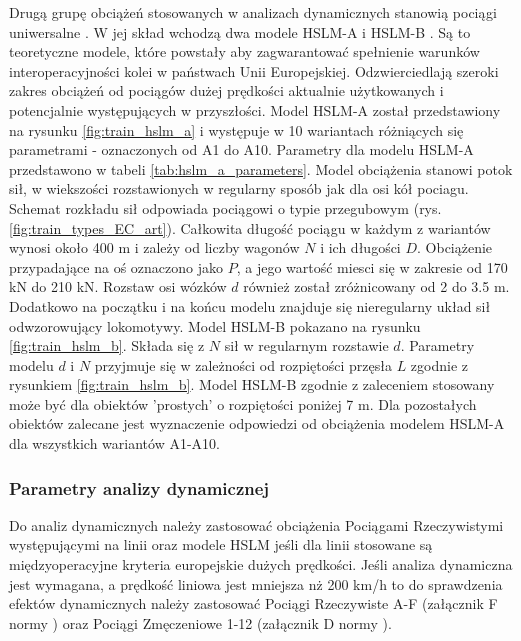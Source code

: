 Drugą grupę obciążeń stosowanych w analizach dynamicznych stanowią pociągi uniwersalne . W jej skład wchodzą dwa modele HSLM-A i HSLM-B . Są to teoretyczne modele, które powstały aby zagwarantować spełnienie warunków interoperacyjności kolei w państwach Unii Europejskiej. Odzwierciedlają szeroki zakres obciążeń od pociągów dużej prędkości aktualnie użytkowanych i potencjalnie występujących w przyszłości. Model HSLM-A został przedstawiony na rysunku \ref{fig:train_hslm_a} i występuje w 10 wariantach różniących się parametrami - oznaczonych od A1 do A10. Parametry dla modelu HSLM-A przedstawono w tabeli \ref{tab:hslm_a_parameters}. Model obciążenia stanowi potok sił, w wiekszości rozstawionych w regularny sposób jak dla osi kół pociagu. Schemat rozkładu sił odpowiada pociągowi o typie przegubowym (rys. \ref{fig:train_types_EC_art}). Całkowita długość pociągu w każdym z wariantów wynosi około 400 m i zależy od liczby wagonów $N$ i ich długości $D$. Obciążenie przypadające na oś oznaczono jako $P$, a jego wartość miesci się w zakresie od 170 kN do 210 kN. Rozstaw osi wózków $d$ również został zróżnicowany od 2 do 3.5 m. Dodatkowo na początku i na końcu modelu znajduje się nieregularny układ sił odwzorowujący lokomotywy. Model HSLM-B pokazano na rysunku \ref{fig:train_hslm_b}. Składa się z $N$ sił w regularnym rozstawie $d$. Parametry modelu $d$ i $N$ przyjmuje się w zależności od rozpiętości przęsła $L$ zgodnie z rysunkiem \ref{fig:train_hslm_b}. Model HSLM-B zgodnie z zaleceniem stosowany może być dla obiektów 'prostych' o rozpiętości poniżej 7 m. Dla pozostałych obiektów zalecane jest wyznaczenie odpowiedzi od obciążenia modelem HSLM-A dla wszystkich wariantów A1-A10.

\subsubsection{Parametry analizy dynamicznej}

Do analiz dynamicznych należy zastosować obciążenia Pociągami Rzeczywistymi występującymi na linii oraz modele HSLM jeśli dla linii stosowane są międzyoperacyjne kryteria europejskie dużych prędkości. Jeśli analiza dynamiczna jest wymagana, a prędkość liniowa jest mniejsza nż 200 km/h to do sprawdzenia efektów dynamicznych należy zastosować Pociągi Rzeczywiste A-F (załącznik F normy \cite{PKNj}) oraz Pociągi Zmęczeniowe 1-12 (załącznik D normy \cite{PKNj}).


